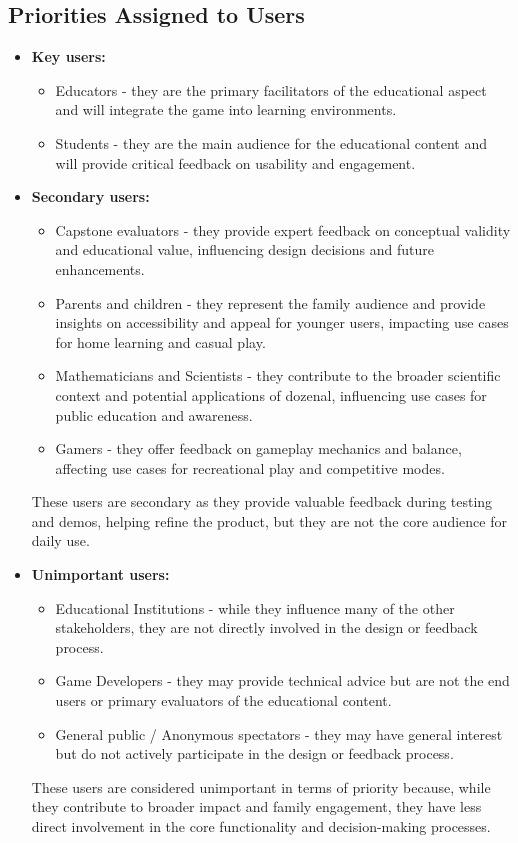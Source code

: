 \documentclass[12pt]{article}
\begin{document}
\subsection{Priorities Assigned to Users}
\begin{itemize}
  \item \textbf{Key users:}
    \begin{itemize}
      \item Educators - they are the primary facilitators of the educational aspect and will integrate the game into learning environments.
      \item Students - they are the main audience for the educational content and will provide critical feedback on usability and engagement.
    \end{itemize}
  
  \item \textbf{Secondary users:}
    \begin{itemize}
      \item Capstone evaluators - they provide expert feedback on conceptual validity and educational value, influencing design decisions and future enhancements.
      \item Parents and children - they represent the family audience and provide insights on accessibility and appeal for younger users, impacting use cases for home learning and casual play.
      \item Mathematicians and Scientists - they contribute to the broader scientific context and potential applications of dozenal, influencing use cases for public education and awareness.
      \item Gamers - they offer feedback on gameplay mechanics and balance, affecting use cases for recreational play and competitive modes.
    \end{itemize}
    These users are secondary as they provide valuable feedback during testing and demos, helping refine the product, but they are not the core audience for daily use.
  
  \item \textbf{Unimportant users:}
    \begin{itemize}
      \item Educational Institutions - while they influence many of the other stakeholders, they are not directly involved in the design or feedback process.
      \item Game Developers - they may provide technical advice but are not the end users or primary evaluators of the educational content.
      \item General public / Anonymous spectators - they may have general interest but do not actively participate in the design or feedback process.
    \end{itemize}
    These users are considered unimportant in terms of priority because, while they contribute to broader impact and family engagement, they have less direct involvement in the core functionality and decision-making processes.
\end{itemize}
\end{document}
